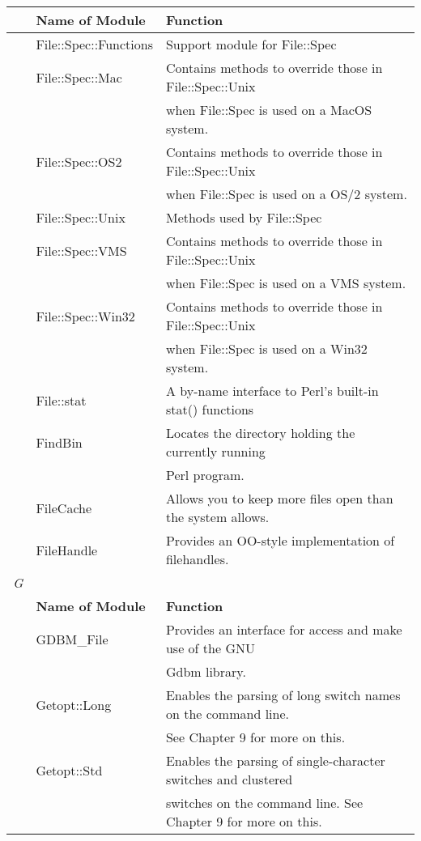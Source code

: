 \documentclass[a4paper,11pt]{book}
\begin{document}
\begin{tabular}{|p{0.3in}|p{1.3in}|p{2.6in}|} \hline 
 & \textbf{Name of Module} & \textbf{Function} \\ \hline 
 & File::Spec::Functions & Support module for File::Spec \\ \hline 
 & File::Spec::Mac & Contains methods to override those in File::Spec::Unix \\ \hline 
 &  & when File::Spec is used on a MacOS system. \\ \hline 
 & File::Spec::OS2 & Contains methods to override those in File::Spec::Unix \\ \hline 
 &  & when File::Spec is used on a OS/2 system. \\ \hline 
 & File::Spec::Unix & Methods used by File::Spec \\ \hline 
 & File::Spec::VMS & Contains methods to override those in File::Spec::Unix \\ \hline 
 &  & when File::Spec is used on a VMS system. \\ \hline 
 & File::Spec::Win32 & Contains methods to override those in File::Spec::Unix \\ \hline 
 &  & when File::Spec is used on a Win32 system. \\ \hline 
 & File::stat & A by-name interface to Perl's built-in stat() functions \\ \hline 
 & FindBin & Locates the directory holding the currently running \\ \hline 
 &  & Perl program. \\ \hline 
 & FileCache & Allows you to keep more files open than the system allows. \\ \hline 
 & FileHandle & Provides an OO-style implementation of filehandles. \\ \hline 
\newline \textit{G} &  &  \\ \hline 
 & \textbf{Name of Module} & \textbf{Function} \\ \hline 
 & GDBM\_File & Provides an interface for access and make use of the GNU \\ \hline 
 &  & Gdbm library. \\ \hline 
 & Getopt::Long & Enables the parsing of long switch names on the command line. \\ \hline 
 &  & See Chapter 9 for more on this. \\ \hline 
 & Getopt::Std & Enables the parsing of single-character switches and clustered \\ \hline 
 &  & switches on the command line. See Chapter 9 for more on this. \\ \hline 
\end{tabular}
\end{document}
